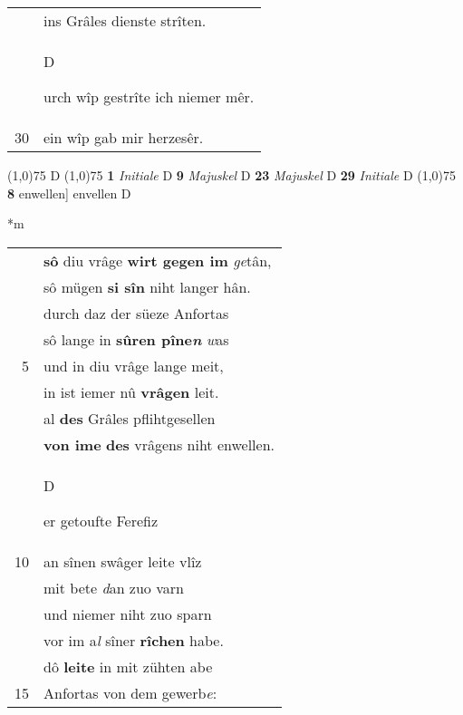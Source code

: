 \documentclass[8pt,a4paper,notitlepage]{article}
\begin{document}
\begin{table}[ht]
\begin{minipage}[t]{0.5\linewidth}
\begin{tabular}{rl}
 & ins Grâles dienste strîten.\\ 
 & \begin{large}D\end{large}urch wîp gestrîte ich niemer mêr.\\ 
30 & ein wîp gab mir herzesêr.\\ 
\end{tabular}
\scriptsize
\line(1,0){75} \newline
D \newline
\line(1,0){75} \newline
\textbf{1} \textit{Initiale} D  \textbf{9} \textit{Majuskel} D  \textbf{23} \textit{Majuskel} D  \textbf{29} \textit{Initiale} D  \newline
\line(1,0){75} \newline
\textbf{8} enwellen] envellen D \newline
\end{minipage}
\hspace{0.5cm}
\begin{minipage}[t]{0.5\linewidth}
\small
\begin{center}*m
\end{center}
\begin{tabular}{rl}
 & \textbf{sô} diu vrâge \textbf{wirt gegen im} \textit{ge}tân,\\ 
 & sô mügen \textbf{si sîn} niht langer hân.\\ 
 & durch daz der süeze Anfortas\\ 
 & sô lange in \textbf{sûren pîne\textit{n}} \textit{w}as\\ 
5 & und in diu vrâge lange meit,\\ 
 & in ist iemer nû \textbf{vrâgen} leit.\\ 
 & al \textbf{des} Grâles pflihtgesellen\\ 
 & \textbf{von ime} \textbf{des} vrâgens niht enwellen.\\ 
 & \begin{large}D\end{large}er getoufte Ferefiz\\ 
10 & an sînen swâger leite vlîz\\ 
 & mit bete \textit{d}an zuo varn\\ 
 & und niemer niht zuo sparn\\ 
 & vor im a\textit{l} sîner \textbf{rîchen} habe.\\ 
 & dô \textbf{leite} in mit zühten abe\\ 
15 & Anfortas von dem gewerb\textit{e}:\\ 

\end{tabular}
\end{minipage}
\end{table}
\end{document}
